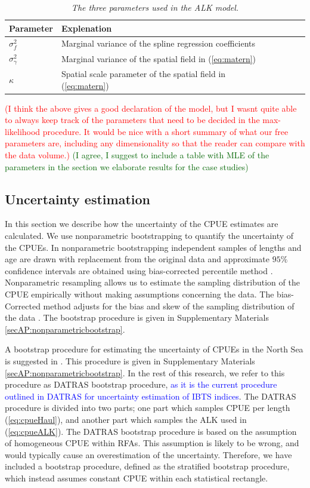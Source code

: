 \documentclass[a4paper 12pt]{article}
\numberwithin{equation}{section}
\newcommand{\ed}[1]{\textcolor{red}{#1}}
\newcommand{\nat}[1]{\textcolor{blue}{#1}}
\newcommand{\olav}[1]{\textcolor{darkgreen}{#1}}
\begin{document}
{\begin{table}[hh!]
\begin{tabular}{lllllr}
Parameter &\bf{Explenation}  \\
\midrule
$\sigma_f^2$	& Marginal variance of the spline regression coefficients \\
$\sigma_{\gamma}^2$ &Marginal variance of the spatial field in (\ref{eq:matern})			\\
$\kappa$	&  Spatial scale parameter of the spatial field	in (\ref{eq:matern})\\
\bottomrule
\end{tabular}
\caption{\textit{The three parameters used in the ALK model.}}
\label{tab:parameters}
\end{table}

\ed{(I think the above gives a good declaration of the model, but I wasnt quite able to always keep track of the parameters that need to be decided in the max-likelihood procedure. It would be nice with a short summary of what our free parameters are, including any dimensionality so that the reader can compare with the data volume.)} \olav{(I agree, I suggest to include a table with MLE of the parameters in the section we elaborate results for the case studies)}

\subsection{Uncertainty estimation}
\label{sec:uncertaintyestimation}
In this section we describe how the uncertainty of the CPUE estimates are calculated. We use nonparametric bootstrapping to quantify the uncertainty of the CPUEs. In nonparametric bootstrapping independent samples of lengths and age are drawn with replacement from the original data and approximate $95\%$ confidence intervals are obtained using bias-corrected percentile method  \citep{carpenter2000bootstrap}. Nonparametric resampling allows us to estimate the sampling distribution of the CPUE empirically without making assumptions concerning the data. The bias-Corrected method adjusts for the bias and skew of the sampling distribution of the data \citep{puth2015variety, karlsson2009bootstrap}. The bootstrap procedure is given in Supplementary Materials \ref{secAP:nonparametricbootstrap}.  

A bootstrap procedure for estimating the uncertainty of CPUEs in the North Sea is suggested in \nat{\citet{ICES2006Report}}. This procedure is given in Supplementary Materials \ref{secAP:nonparametricbootstrap}. In the rest of this research, we refer to this procedure as DATRAS bootstrap procedure, \nat{as it is the current procedure outlined in DATRAS for uncertainty estimation of IBTS indices}. The DATRAS procedure is divided into two parts; one part which samples CPUE per length (\ref{eq:cpueHaul}), and another part which samples the ALK used in (\ref{eq:cpueALK}). The DATRAS bootstrap procedure is based on the assumption of homogeneous CPUE within RFAs. This assumption is likely to be wrong, and would typically cause an overestimation of the uncertainty.  Therefore, we have included a bootstrap procedure, defined as the stratified bootstrap procedure, which instead assumes constant CPUE within each statistical rectangle. 

}
\end{document}
